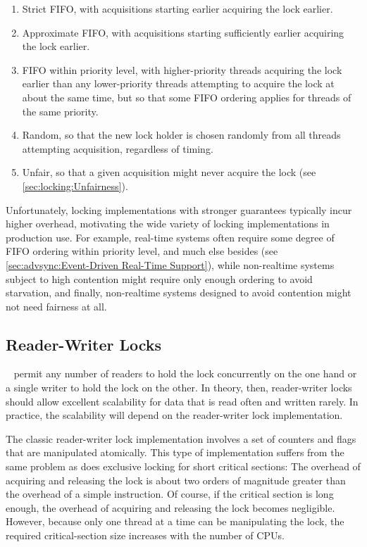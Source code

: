 \begin{enumerate}
\item	Strict FIFO, with acquisitions starting earlier acquiring
	the lock earlier.
\item	Approximate FIFO, with acquisitions starting sufficiently
	earlier acquiring the lock earlier.
\item	FIFO within priority level, with higher-priority threads
	acquiring the lock earlier than any lower-priority threads
	attempting to acquire the lock at about the same time, but so
	that some FIFO ordering applies for threads of the same priority.
\item	Random, so that the new lock holder is chosen randomly from
	all threads attempting acquisition, regardless of timing.
\item	
	Unfair, so that a given acquisition might never acquire the lock
	(see \cref{sec:locking:Unfairness}).
\end{enumerate}

Unfortunately, locking implementations with stronger guarantees
typically incur higher overhead, motivating the wide variety of locking
implementations in production use.
For example, real-time systems often require some degree of FIFO
ordering within priority level, and much else besides
(see \cref{sec:advsync:Event-Driven Real-Time Support}),
while non-realtime systems subject to high contention might require
only enough ordering to avoid starvation, and finally, non-realtime
systems designed to avoid contention might not need fairness at all.

\subsection{Reader-Writer Locks}
\label{sec:locking:Reader-Writer Locks}

~\cite{Courtois71}
permit any number of readers to hold the lock
concurrently on the one hand or a single writer to hold the lock
on the other.
In theory, then, reader-writer locks should allow excellent scalability
for data that is read often and written rarely.
In practice, the scalability will depend on the reader-writer lock
implementation.

The classic reader-writer lock implementation involves a set of
counters and flags that are manipulated atomically.
This type of implementation suffers from the same problem as does
exclusive locking for short critical sections: The overhead of acquiring
and releasing the lock
is about two orders of magnitude greater than the overhead
of a simple instruction.
Of course, if the critical section is long enough, the overhead of
acquiring and releasing the lock becomes negligible.
However, because only
one thread at a time can be manipulating the lock, the required
critical-section size increases with the number of CPUs.

